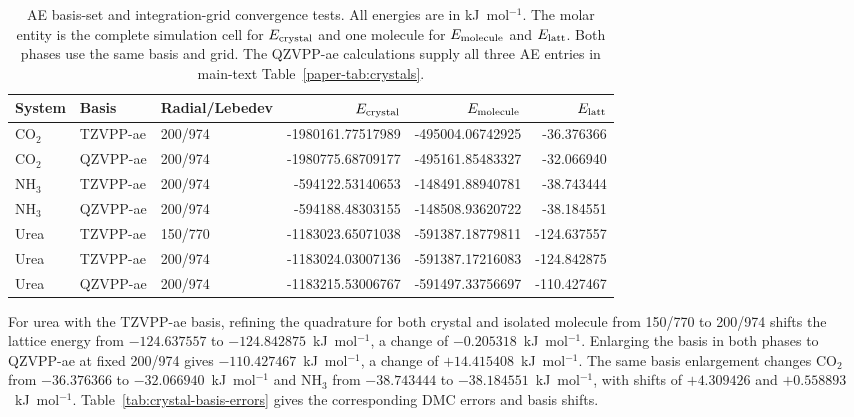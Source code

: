 \documentclass[10pt,a4paper]{article}
\begin{document}
\begin{table}[htbp]
\centering
\small
\caption{AE basis-set and integration-grid convergence tests. All energies are in kJ~mol$^{-1}$. The molar entity is the complete simulation cell for $E_{\rm crystal}$ and one molecule for $E_{\rm molecule}$ and $E_{\rm latt}$. Both phases use the same basis and grid. The QZVPP-ae calculations supply all three AE entries in main-text Table~\ref{paper-tab:crystals}.}
\label{tab:urea-basis}
\begin{tabular}{lllrrr}
\toprule
System & Basis & Radial/Lebedev & $E_{\rm crystal}$ & $E_{\rm molecule}$ & $E_{\rm latt}$\\
\midrule
CO$_2$ & TZVPP-ae & 200/974 & -1980161.77517989 & -495004.06742925 & -36.376366\\
CO$_2$ & QZVPP-ae & 200/974 & -1980775.68709177 & -495161.85483327 & -32.066940\\
NH$_3$ & TZVPP-ae & 200/974 & -594122.53140653 & -148491.88940781 & -38.743444\\
NH$_3$ & QZVPP-ae & 200/974 & -594188.48303155 & -148508.93620722 & -38.184551\\
Urea & TZVPP-ae & 150/770 & -1183023.65071038 & -591387.18779811 & -124.637557\\
Urea & TZVPP-ae & 200/974 & -1183024.03007136 & -591387.17216083 & -124.842875\\
Urea & QZVPP-ae & 200/974 & -1183215.53006767 & -591497.33756697 & -110.427467\\
\bottomrule
\end{tabular}
\end{table}

For urea with the TZVPP-ae basis, refining the quadrature for both crystal and isolated molecule from 150/770 to 200/974 shifts the lattice energy from $-124.637557$ to $-124.842875$~kJ~mol$^{-1}$, a change of $-0.205318$~kJ~mol$^{-1}$. Enlarging the basis in both phases to QZVPP-ae at fixed 200/974 gives $-110.427467$~kJ~mol$^{-1}$, a change of $+14.415408$~kJ~mol$^{-1}$. The same basis enlargement changes CO$_2$ from $-36.376366$ to $-32.066940$~kJ~mol$^{-1}$ and NH$_3$ from $-38.743444$ to $-38.184551$~kJ~mol$^{-1}$, with shifts of $+4.309426$ and $+0.558893$~kJ~mol$^{-1}$. Table~\ref{tab:crystal-basis-errors} gives the corresponding DMC errors and basis shifts.
\end{document}
